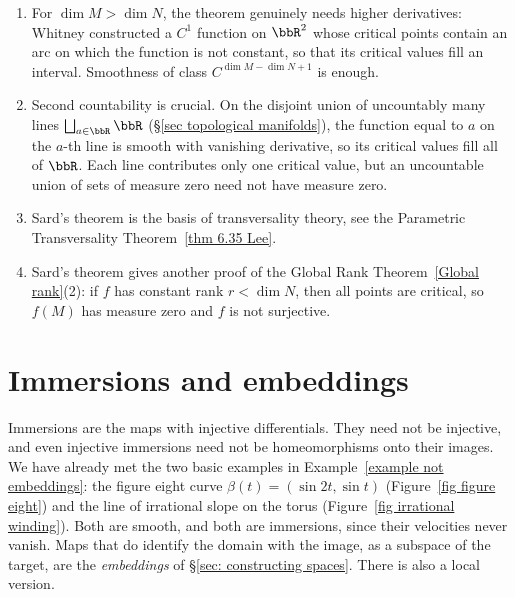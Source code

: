 \begin{rem}
    \begin{enumerate}
        \item For $\dim M>\dim N$, the theorem genuinely needs higher derivatives: Whitney constructed a $C^1$ function on $\bbR^2$ whose critical points contain an arc on which the function is not constant, so that its critical values fill an interval. Smoothness of class $C^{\dim M-\dim N+1}$ is enough.
        \item Second countability is crucial. On the disjoint union of uncountably many lines $\bigsqcup_{a\in\bbR}\bbR$ (\S\ref{sec topological manifolds}), the function equal to $a$ on the $a$-th line is smooth with vanishing derivative, so its critical values fill all of $\bbR$. Each line contributes only one critical value, but an uncountable union of sets of measure zero need not have measure zero.
        \item Sard's theorem is the basis of transversality theory, see the Parametric Transversality Theorem~\ref{thm 6.35 Lee}.
        \item Sard's theorem gives another proof of the Global Rank Theorem~\ref{Global rank}(2): if $f$ has constant rank $r<\dim N$, then all points are critical, so $f(M)$ has measure zero and $f$ is not surjective.
    \end{enumerate}
\end{rem}


\section{Immersions and embeddings}\label{sec immersions embeddings}

Immersions are the maps with injective differentials. They need not be injective, and even injective immersions need not be homeomorphisms onto their images. We have already met the two basic examples in Example~\ref{example not embeddings}: the figure eight curve $\beta(t)=(\sin2t,\sin t)$ (Figure~\ref{fig figure eight}) and the line of irrational slope on the torus (Figure~\ref{fig irrational winding}). Both are smooth, and both are immersions, since their velocities never vanish. Maps that do identify the domain with the image, as a subspace of the target, are the \emph{embeddings} of \S\ref{sec: constructing spaces}. There is also a local version.

